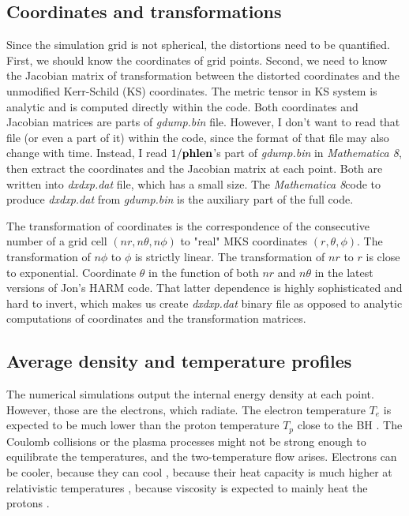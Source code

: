 \documentclass{emulateapj}
\newcommand{\mat}{\textit{Mathematica 8}}
\begin{document}
\subsection{Coordinates and transformations}
Since the simulation grid is not spherical, the distortions need to be quantified.
First, we should know the coordinates of grid points. Second, we need to know the Jacobian matrix of transformation between the distorted coordinates and
the unmodified Kerr-Schild (KS) coordinates. The metric tensor in KS system is analytic and is computed directly within the code.
Both coordinates and Jacobian matrices are parts of \textit{gdump.bin} file. However, I don't want to read that file (or even a part of it) within the code,
since the format of that file may also change with time. Instead, I read $1/{\bf phlen}$'s part of \textit{gdump.bin} in \mat, then extract the coordinates and the Jacobian matrix at each point.
Both are written into \textit{dxdxp.dat} file, which has a small size.
The \mat code to produce \textit{dxdxp.dat} from \textit{gdump.bin} is the auxiliary part of the full code.

The transformation of coordinates is the correspondence of the consecutive number of a grid cell $(nr,n\theta,n\phi)$ to "real" MKS coordinates $(r,\theta,\phi)$.
The transformation of $n\phi$ to $\phi$ is strictly linear. The transformation of $nr$ to $r$ is close to exponential.
Coordinate $\theta$ in the function of both $nr$ and $n\theta$ in the latest versions of Jon's HARM code.
That latter dependence is highly sophisticated and hard to invert, which makes us create \textit{dxdxp.dat} binary file as opposed to analytic computations of coordinates
and the transformation matrices.

\subsection{Average density and temperature profiles}
The numerical simulations output the internal energy density at each point. However, those are the electrons, which radiate.
The electron temperature $T_e$ is expected to be much lower than the proton temperature $T_p$ close to the BH \citep{Narayan:1995kj}.
The Coulomb collisions or the plasma processes might not be strong enough to equilibrate the temperatures, and the two-temperature flow arises.
Electrons can be cooler, because they can cool \citep{Drappeau:2012dq}, because their heat capacity is much higher at relativistic temperatures \citep{Shcherbakov:2010cond},
because viscosity is expected to mainly heat the protons \citep{Narayan:1995kj,Sharma_heating:2007}.
\end{document}
